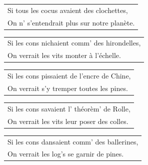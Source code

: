 \documentclass{article}
\begin{document}
\begin{flushleft}
\begin{tabularx}{0.8\textwidth} {
   >{\raggedright\arraybackslash}X}
Si tous les cocus avaient des clochettes,\\
On n’ s’entendrait plus sur notre planète.\\
\end{tabularx}
\end{flushleft}
\begin{flushleft}
\begin{tabularx}{0.8\textwidth} {
   >{\raggedright\arraybackslash}X}
Si les cons nichaient comm’ des hirondelles,\\
On verrait les vits monter à l’échelle.\\
\end{tabularx}
\end{flushleft}
\begin{flushleft}
\begin{tabularx}{0.8\textwidth} {
   >{\raggedright\arraybackslash}X}
Si les cons pissaient de l’encre de Chine,\\
On verrait s’y tremper toutes les pines.\\
\end{tabularx}
\end{flushleft}
\begin{flushleft}
\begin{tabularx}{0.8\textwidth} {
   >{\raggedright\arraybackslash}X}
Si les cons savaient l’ théorèm’ de Rolle, \\
On verrait les vits leur poser des colles. \\
\end{tabularx}
\end{flushleft}
\begin{flushleft}
\begin{tabularx}{0.8\textwidth} {
   >{\raggedright\arraybackslash}X}
Si les cons dansaient comm’ des ballerines, \\
On verrait les log’s se garnir de pines. \\
\end{tabularx}
\end{flushleft}
\end{document}
